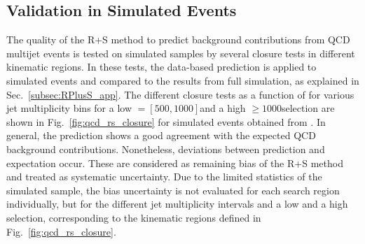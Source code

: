 \subsection{Validation in Simulated Events}
\label{subsec:validation_mc}
The quality of the R+S method to predict background contributions from QCD multijet events is tested on simulated samples by several closure tests in different kinematic regions. In these tests, the data-based prediction is applied to simulated events and compared to the results from full simulation, as explained in Sec.~\ref{subsec:RPlusS_app}. The different closure tests as a function of \MHT for various jet multiplicity bins for a low \HT $= [500, 1000]$\gev and a high \HT $\ge 1000$\gev selection are shown in Fig.~\ref{fig:qcd_rs_closure} for simulated events obtained from \madgraph. In general, the prediction shows a good agreement with the expected QCD background contributions. Nonetheless, deviations between prediction and expectation occur. These are considered as remaining bias of the R+S method and treated as systematic uncertainty. Due to the limited statistics of the simulated sample, the bias uncertainty is not evaluated for each search region individually, but for the different jet multiplicity intervals and a low and a high \HT selection, corresponding to the kinematic regions defined in Fig.~\ref{fig:qcd_rs_closure}.
